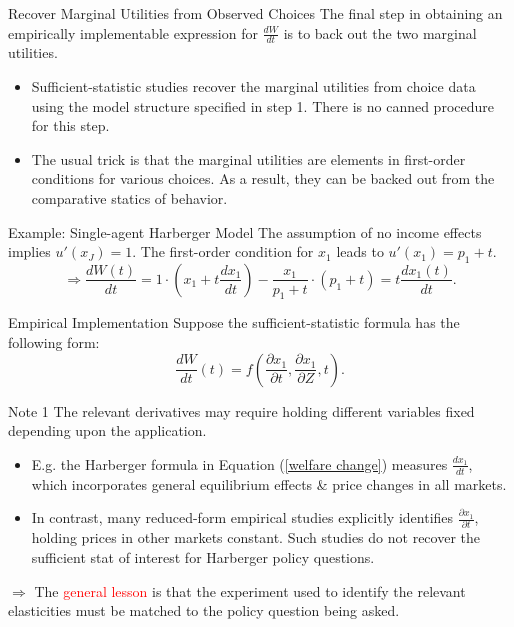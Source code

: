 \documentclass{beamer}
\begin{document}
\begin{frame}[label=ex_hgb_back]{Recover Marginal Utilities from Observed Choices}
	The final step in obtaining an empirically implementable expression for $\frac{dW}{dt}$ is to back out the two marginal utilities.
	\begin{itemize}
		\item Sufficient-statistic studies recover the marginal utilities from choice data using the model structure specified in step 1. There is no canned procedure for this step.
		\item The usual trick is that the marginal utilities are elements in first-order conditions for various choices. As a result, they can be backed out from the comparative statics of behavior.
	\end{itemize}
	\begin{block}{Example: Single-agent Harberger Model \hyperlink{ex_harberger}{}}
		The assumption of no income effects implies $u'(x_J)=1$. The first-order condition for $x_1$ leads to $u'(x_1)=p_1+t$.
		\begin{equation}\nonumber
			\Rightarrow \frac{dW(t)}{dt} = 1\cdot \left(x_1+t\frac{dx_1}{dt}\right)-\frac{x_1}{p_1+t}\cdot (p_1+t) = t\frac{dx_1(t)}{dt}.
		\end{equation}
	\end{block}
\end{frame}
\begin{frame}{Empirical Implementation}
	Suppose the sufficient-statistic formula has the following form:
	\begin{equation}\label{eq16}
		\frac{dW}{dt}(t) = f\left(\frac{\partial x_1}{\partial t},\frac{\partial x_1}{\partial Z},t \right).
	\end{equation}
	\begin{block}{Note 1}
		The relevant derivatives may require holding different variables fixed depending upon the application.
		\begin{itemize}
			\item E.g. the Harberger formula in Equation (\ref{welfare change}) measures $\frac{dx_1}{dt}$, which incorporates general equilibrium effects \& price changes in all markets.
			\item In contrast, many reduced-form empirical studies explicitly	identifies $\frac{\partial x_1}{\partial t}$, holding prices in other markets constant. Such studies do not recover the sufficient stat of interest for Harberger policy questions.
		\end{itemize}
		$\Rightarrow$ The \textcolor{red}{general lesson} is that the experiment used to identify the relevant elasticities must be matched to the policy question being asked.
	\end{block}
\end{frame}
\end{document}
